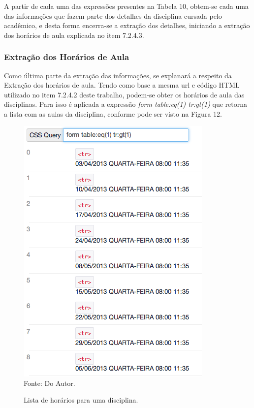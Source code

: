 \newpage
A partir de cada uma das expressões presentes na Tabela 10, obtem-se cada uma das informações que fazem parte dos detalhes da disciplina cursada pelo acadêmico, e desta forma encerra-se a extração dos detalhes, iniciando a extração dos horários de aula explicada no item 7.2.4.3.

\subsubsection{Extração dos Horários de Aula}
Como última parte da extração das informações, se explanará a respeito da Extração dos horários de aula. Tendo como base a mesma url e código HTML utilizado no item 7.2.4.2 deste trabalho, podem-se obter os horários de aula das disciplinas. Para isso é aplicada a expressão \emph{form table:eq(1) tr:gt(1)} que retorna a lista com as aulas da disciplina, conforme pode ser visto na Figura 12.

\begin{figure}[!htb]
     \centering
     \caption[Extração de Informações - Horários do Semestre]{Lista de horários para uma disciplina.}
     \includegraphics[scale=0.5]{imagens/listahorariossemestre.png}
     \\  Fonte: Do Autor.
\end{figure}

